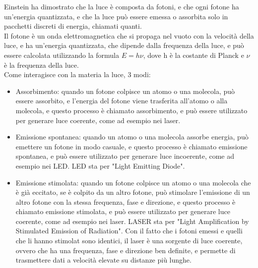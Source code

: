 Einstein ha dimostrato che la luce è composta da fotoni, e che ogni fotone ha un'energia quantizzata, e che la luce può essere emessa o assorbita solo in pacchetti discreti di energia, chiamati quanti.\\

Il fotone è un onda elettromagnetica che si propaga nel vuoto con la velocità della luce, e ha un'energia quantizzata, che dipende dalla frequenza della luce, 
e può essere calcolata utilizzando la formula $E = h\nu$, dove h è la costante di Planck e $\nu$ è la frequenza della luce.\\

Come interagisce con la materia la luce, 3 modi:
\begin{itemize}
    \item Assorbimento: quando un fotone colpisce un atomo o una molecola, può essere assorbito, e l'energia del fotone viene trasferita all'atomo o alla molecola, 
    e questo processo è chiamato assorbimento, e può essere utilizzato per generare luce coerente, come ad esempio nei laser.\\
    \item Emissione spontanea: quando un atomo o una molecola assorbe energia, può emettere un fotone in modo casuale, e questo processo è chiamato emissione spontanea, 
    e può essere utilizzato per generare luce incoerente, come ad esempio nei LED. LED sta per "Light Emitting Diode".\\
    \item Emissione stimolata: quando un fotone colpisce un atomo o una molecola che è già eccitato, se è colpito da un altro fotone, può stimolare l'emissione di un altro fotone con la stessa frequenza, fase e direzione, 
    e questo processo è chiamato emissione stimolata, e può essere utilizzato per generare luce coerente, come ad esempio nei laser. LASER sta per "Light Amplification by Stimulated Emission of Radiation".
    Con il fatto che i fotoni emessi e quelli che li hanno stimolat sono identici, il laser è una sorgente di luce coerente, ovvero che ha una frequenza, fase e direzione ben definite, e permette di trasmettere dati a velocità elevate su distanze più lunghe.\\
\end{itemize}

